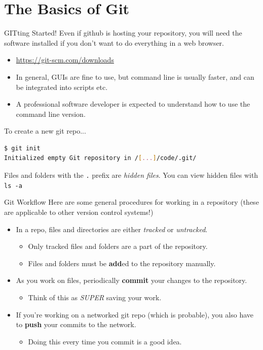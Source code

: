 \documentclass[11pt]{beamer}
\begin{document}
\section[Git Basics]{The Basics of Git}
\begin{frame}[fragile=singleslide]{GITting Started!}
Even if github is hosting your repository, you will need the software installed if you don't want to do everything in a web browser.
\begin{itemize}
\item \url{https://git-scm.com/downloads}
\item In general, GUIs are fine to use, but command line is usually faster, and can be integrated into scripts etc.  
\item A professional software developer is expected to understand how to use the command line version.
\end{itemize}
To create a new git repo...
\begin{lstlisting}[style=C, language=bash]
$ git init
Initialized empty Git repository in /[...]/code/.git/
\end{lstlisting}
Files and folders with the \texttt{.} prefix are \emph{hidden files}.  You can view hidden files with \texttt{ls -a}
\end{frame}

\begin{frame}{Git Workflow}
Here are some general procedures for working in a repository (these are applicable to other version control systems!)
\begin{itemize}
\item In a repo, files and directories are either \emph{tracked} or \emph{untracked}.  
\begin{itemize}
\item Only tracked files and folders are a part of the repository.  
\item Files and folders must be \textbf{add}ed to the repository manually.
\end{itemize}
\item As you work on files, periodically \textbf{commit} your changes to the repository.  
\begin{itemize}
\item Think of this as \emph{SUPER} saving your work.
\end{itemize}
\item If you're working on a networked git repo (which is probable), you also have to \textbf{push} your commits to the network.  
\begin{itemize}
\item Doing this every time you commit is a good idea.  
\end{itemize}
\end{itemize}
\end{frame}
\end{document}
